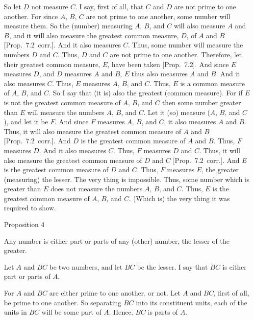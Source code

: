 So let $D$ not measure $C$. I say, first of all, that $C$ and $D$ are not prime
to one another. For since $A$, $B$,  $C$ are not prime to one another,
some number will measure them. So the (number) measuring $A$, $B$, and
$C$ will also measure $A$ and $B$, and it will also measure the greatest common
measure, $D$,  of $A$ and $B$ [Prop.~7.2~corr.].
And it also measures $C$. Thus, some number will measure the numbers $D$ and
$C$. Thus, $D$ and $C$ are not prime to one another. Therefore, let their
greatest common measure, $E$, have been taken  [Prop.~7.2]. And since $E$ measures $D$, and $D$
measures $A$ and $B$, $E$ thus also measures $A$ and $B$. And it also measures $C$.
Thus, $E$ measures $A$, $B$,  and $C$. Thus, $E$ is a common measure of
$A$, $B$,  and $C$. So I say that (it is) also the greatest (common measure).
For if $E$ is not the greatest common measure of $A$, $B$, and $C$ then
some number greater than $E$ will measure the numbers $A$, $B$,  and $C$.
Let it (so) measure ($A$, $B$, and $C$), and let it be $F$. And since $F$
measures $A$, $B$,  and $C$, it also measures $A$ and $B$. 
 Thus, it will also measure the greatest common measure of $A$ and $B$ [Prop.~7.2~corr.]. And $D$ is the greatest common measure
of $A$ and $B$. Thus,  $F$ measures $D$. And it also measures $C$. Thus, $F$
measures $D$ and $C$. Thus, it will also measure the greatest common
measure of $D$ and $C$ [Prop.~7.2~corr.]. And
$E$ is the greatest common measure of $D$ and $C$. Thus, $F$ measures $E$, the
greater (measuring) the lesser. The very thing is impossible. Thus,
some number which is greater than $E$ does not measure the numbers $A$, $B$, and $C$.
Thus, $E$ is the greatest common measure of $A$, $B$, and $C$. (Which is)
the very thing it was required to show.


\begin{center}
{\large Proposition 4}
\end{center}

Any number is either part or parts of  any (other) number,
the lesser of the greater.

Let $A$ and $BC$ be two numbers, and let $BC$ be the lesser. I say that $BC$
is either part or parts of $A$.

For $A$ and $BC$ are either prime to one another, or not. Let $A$
and $BC$, first of all, be prime to one another. So separating $BC$ into its
constituent units, each of the units in $BC$ will be some part of $A$. Hence, $BC$ is parts of $A$.\\

